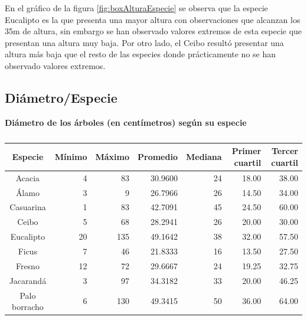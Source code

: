\documentclass[11pt]{article}
\begin{document}
\begin{justify}
  En el gráfico de la figura \ref{fig:boxAlturaEspecie} se observa
  que la especie Eucalipto es la que presenta una mayor altura con observaciones
  que alcanzan los 35m de altura, sin embargo se han observado valores extremos
  de esta especie que presentan una altura muy baja. Por otro lado, el Ceibo
  resultó presentar una altura más baja que el resto de las especies donde
  prácticamente no se han observado valores extremos.
\end{justify}


\newpage
\subsection{Diámetro/Especie}

\begin{table}[h!]
  \begin{center}
    \caption*{\textbf{Diámetro de los árboles (en centímetros) según su especie}}
    \begin{tabular}{| c | r | r | r | r | r | r |}
      \hline
      \textbf{Especie} & \textbf{Mínimo} & \textbf{Máximo} & \textbf{Promedio} &
      \textbf{Mediana} & \textbf{Primer cuartil} & \textbf{Tercer cuartil}  \\ \hline
      Acacia & 4 & 83 & 30.9600 & 24 & 18.00 & 38.00 \\ \hline
      Álamo & 3 & 9 & 	26.7966 & 26 & 14.50 & 34.00 \\ \hline
      Casuarina & 1 & 83 & 42.7091 & 45 & 24.50 & 60.00 \\ \hline
      Ceibo & 5 & 68 & 28.2941 & 26 & 20.00 & 30.00 \\ \hline
      Eucalipto & 20 & 135 & 49.1642 & 38 & 32.00 & 57.50 \\ \hline
      Ficus & 7 & 46 & 21.8333 & 16 & 13.50 & 27.50 \\ \hline
      Fresno & 12 & 72 & 29.6667 & 24 & 19.25 & 32.75 \\ \hline
      Jacarandá & 3 & 97 & 34.3182 & 33 & 20.00 & 46.25 \\ \hline
      Palo borracho & 6 & 130 & 49.3415 & 50 & 36.00 & 64.00 \\ \hline
    \end{tabular}
    \caption{}
    \label{tab:tablaDiametroEspecie}
  \end{center}
\end{table}
\end{document}

